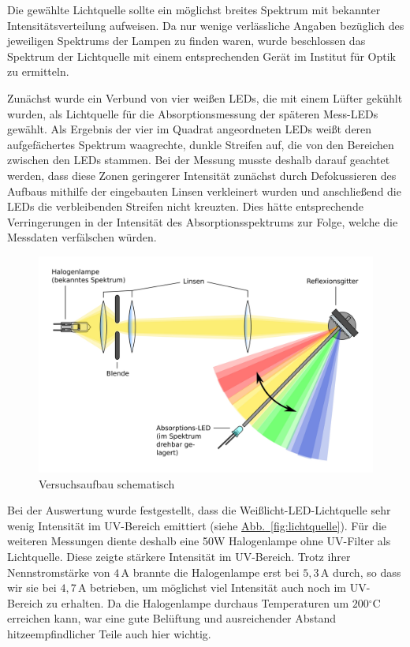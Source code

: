 \documentclass[11pt]{scrartcl}
\newcommand{\unit}[1]{\ensuremath{\,\mathrm{#1}}} %
\newcommand{\degr}{\ensuremath{^\circ}}
\newcommand{\cel}{\ensuremath{\degr\mathrm{C}}}
\newcommand{\hypref}[2]{\hyperref[#2]{{#1}~\ref{#2}}}
\begin{document}
Die gew\"ahlte Lichtquelle sollte ein m\"oglichst breites Spektrum mit bekannter Intensit\"atsverteilung aufweisen. Da nur wenige verlässliche Angaben bez\"uglich des jeweiligen Spektrums der Lampen zu finden waren, wurde beschlossen das Spektrum der Lichtquelle mit einem entsprechenden Ger\"at im Institut f\"ur Optik zu ermitteln.

Zun\"achst wurde ein Verbund von vier wei\ss{}en LEDs, die mit einem L\"ufter gek\"uhlt wurden, als Lichtquelle f\"ur die Absorptionsmessung der sp\"ateren Mess-LEDs gew\"ahlt. Als Ergebnis der vier im Quadrat angeordneten LEDs wei\ss{}t deren aufgef\"achertes Spektrum waagrechte, dunkle Streifen auf, die von den Bereichen zwischen den LEDs stammen. Bei der Messung musste deshalb darauf geachtet werden, dass diese Zonen geringerer Intensit\"at zun\"achst durch Defokussieren des Aufbaus mithilfe der eingebauten Linsen verkleinert wurden und anschlie\ss{}end die LEDs die verbleibenden Streifen nicht kreuzten. Dies h\"atte entsprechende Verringerungen in der Intensit\"at des Absorptionsspektrums zur Folge, welche die Messdaten verf\"alschen w\"urden.

\begin{figure}[!b]
\begin{center}
\includegraphics[width=1.\textwidth]{setup.jpg}
\end{center}
\vspace{-1.5\baselineskip}
\caption{Versuchsaufbau schematisch}
\label{Versuchsaufbau}
\end{figure}

Bei der Auswertung wurde festgestellt, dass die Weißlicht-LED-Lichtquelle sehr wenig Intensit\"at im UV-Bereich emittiert (siehe \hypref{Abb.}{fig:lichtquelle}). F\"ur die weiteren Messungen diente deshalb eine 50W Halogenlampe ohne UV-Filter als Lichtquelle. Diese zeigte st\"arkere Intensit\"at im UV-Bereich. Trotz ihrer Nennstromstärke von $4\unit{A}$ brannte die Halogenlampe erst bei $5,3\unit{A}$ durch, so dass wir sie bei $4,7\unit{A}$ betrieben, um möglichst viel Intensität auch noch im UV-Bereich zu erhalten. Da die Halogenlampe durchaus Temperaturen um $200\cel$ erreichen kann, war eine gute Bel\"uftung und ausreichender Abstand hitzeempfindlicher Teile auch hier wichtig.
\end{document}
